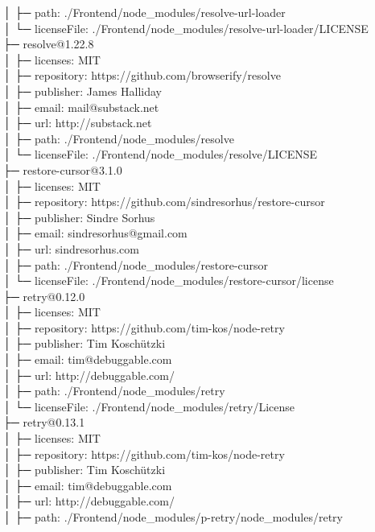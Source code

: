 │  ├─ path: ./Frontend/node\_modules/resolve-url-loader\\
│  └─ licenseFile: ./Frontend/node\_modules/resolve-url-loader/LICENSE\\
├─ resolve@1.22.8\\
│  ├─ licenses: MIT\\
│  ├─ repository: https://github.com/browserify/resolve\\
│  ├─ publisher: James Halliday\\
│  ├─ email: mail@substack.net\\
│  ├─ url: http://substack.net\\
│  ├─ path: ./Frontend/node\_modules/resolve\\
│  └─ licenseFile: ./Frontend/node\_modules/resolve/LICENSE\\
├─ restore-cursor@3.1.0\\
│  ├─ licenses: MIT\\
│  ├─ repository: https://github.com/sindresorhus/restore-cursor\\
│  ├─ publisher: Sindre Sorhus\\
│  ├─ email: sindresorhus@gmail.com\\
│  ├─ url: sindresorhus.com\\
│  ├─ path: ./Frontend/node\_modules/restore-cursor\\
│  └─ licenseFile: ./Frontend/node\_modules/restore-cursor/license\\
├─ retry@0.12.0\\
│  ├─ licenses: MIT\\
│  ├─ repository: https://github.com/tim-kos/node-retry\\
│  ├─ publisher: Tim Koschützki\\
│  ├─ email: tim@debuggable.com\\
│  ├─ url: http://debuggable.com/\\
│  ├─ path: ./Frontend/node\_modules/retry\\
│  └─ licenseFile: ./Frontend/node\_modules/retry/License\\
├─ retry@0.13.1\\
│  ├─ licenses: MIT\\
│  ├─ repository: https://github.com/tim-kos/node-retry\\
│  ├─ publisher: Tim Koschützki\\
│  ├─ email: tim@debuggable.com\\
│  ├─ url: http://debuggable.com/\\
│  ├─ path: ./Frontend/node\_modules/p-retry/node\_modules/retry\\
